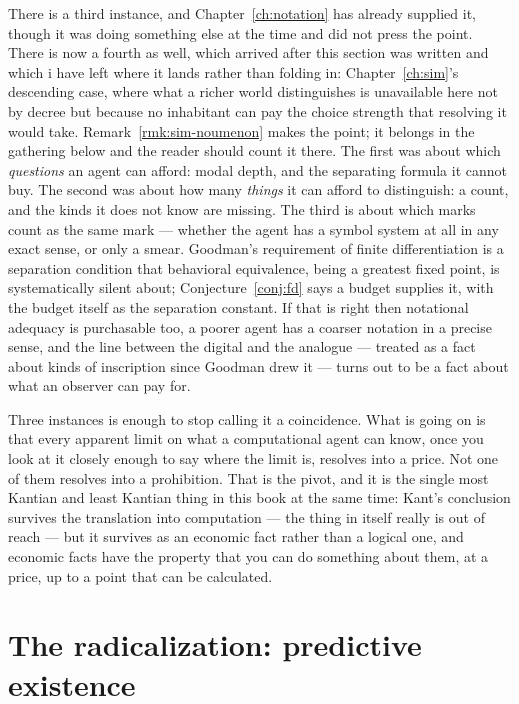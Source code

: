 There is a third instance, and Chapter~\ref{ch:notation} has
already supplied it, though it was doing something else at the time
and did not press the point.
There is now a fourth as well, which arrived after this section was
written and which i have left where it lands rather than folding in:
Chapter~\ref{ch:sim}'s descending case, where what a richer world
distinguishes is unavailable here not by decree but because no
inhabitant can pay the choice strength that resolving it would take.
Remark~\ref{rmk:sim-noumenon} makes the point; it belongs in the
gathering below and the reader should count it there.
The first was about which \emph{questions} an agent can afford:
modal depth, and the separating formula it cannot buy.
The second was about how many \emph{things} it can afford to
distinguish: a count, and the kinds it does not know are missing.
The third is about which marks count as the same mark --- whether
the agent has a symbol system at all in any exact sense, or only a
smear.
Goodman's requirement of finite differentiation is a separation
condition that behavioral equivalence, being a greatest fixed
point, is systematically silent about;
Conjecture~\ref{conj:fd} says a budget supplies it, with the budget
itself as the separation constant.
If that is right then notational adequacy is purchasable too, a
poorer agent has a coarser notation in a precise sense, and the
line between the digital and the analogue --- treated as a fact
about kinds of inscription since Goodman drew it --- turns out to
be a fact about what an observer can pay for.

Three instances is enough to stop calling it a coincidence.
What is going on is that every apparent limit on what a
computational agent can know, once you look at it closely enough to
say where the limit is, resolves into a price.
Not one of them resolves into a prohibition.
That is the pivot, and it is the single most Kantian and least
Kantian thing in this book at the same time: Kant's conclusion
survives the translation into computation --- the thing in itself
really is out of reach --- but it survives as an economic fact
rather than a logical one, and economic facts have the property
that you can do something about them, at a price, up to a point
that can be calculated.

\section{The radicalization: predictive existence}
\label{sec:kant-radical}

